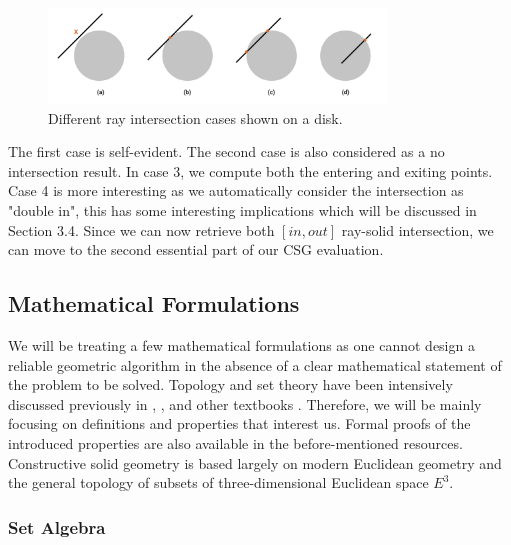 \documentclass[a4paper,11pt,oneside]{article}
\begin{document}
\begin{figure}[ht]
	\begin{center}
		\includegraphics[width=0.8\textwidth]{section3/3.2/intersection_cases.png}
	\end{center}
	\caption{Different ray intersection cases shown on a disk.}
	\label{sec3.2:fig2}
\end{figure}


The first case is self-evident. The second case is also considered as a no intersection result. In case 3, we compute both the entering and exiting points. Case 4 is more interesting as we automatically consider the intersection as "double in", this has some interesting implications which will be discussed in Section 3.4. Since we can now retrieve both $[in, out]$ ray-solid intersection, we can move to the second essential part of our CSG evaluation.

\subsection{Mathematical Formulations}
  
We will be treating a few mathematical formulations as one cannot design a reliable geometric algorithm in the absence of a clear mathematical statement of the problem to be solved. Topology and set theory have been intensively discussed previously in \cite{Requicha1978MathematicalFO}, \cite{tilove1977a}, and other textbooks \cite{lachlan_srebrny_zarach_1977}. Therefore, we will be mainly focusing on definitions and properties that interest us. Formal proofs of the introduced properties are also available in the before-mentioned resources. Constructive solid geometry is based largely on modern Euclidean geometry and the general topology of subsets of three-dimensional Euclidean space $E^3$.
  
\subsubsection{Set Algebra}
  
\theoremstyle{definition}
\newtheorem{definition}{Definition}[section]
  
\theoremstyle{property}
\newtheorem{property}{Property}[section]
    
\end{document}
